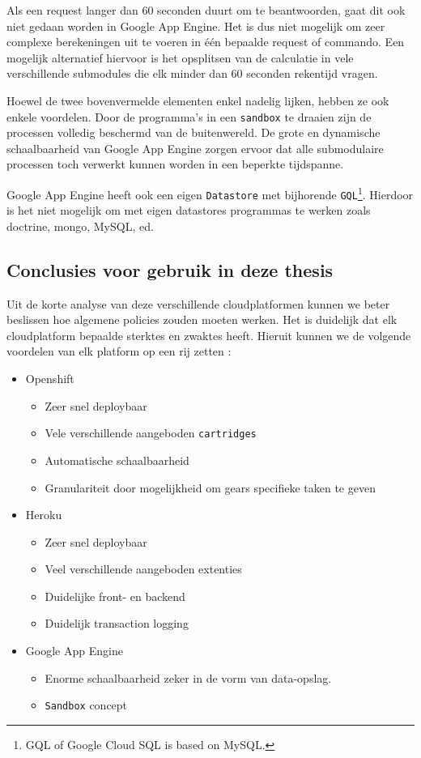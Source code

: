 Als een request langer dan 60 seconden duurt om te beantwoorden, gaat dit ook niet gedaan worden in Google App Engine.
Het is dus niet mogelijk om zeer complexe berekeningen uit te voeren in één bepaalde request of commando.
Een mogelijk alternatief hiervoor is het opsplitsen van de calculatie in vele verschillende submodules die elk minder dan 60 seconden rekentijd vragen.

Hoewel de twee bovenvermelde elementen enkel nadelig lijken, hebben ze ook enkele voordelen.
Door de programma's in een \texttt{sandbox} te draaien zijn de processen volledig beschermd van de buitenwereld.
De grote en dynamische schaalbaarheid van Google App Engine zorgen ervoor dat alle submodulaire processen toch verwerkt kunnen worden in een beperkte tijdspanne.

Google App Engine heeft ook een eigen \texttt{Datastore} met bijhorende \texttt{GQL}\footnote{GQL of Google Cloud SQL is based on MySQL.}.  Hierdoor is het niet mogelijk om met eigen datastores programmas te werken zoals doctrine, mongo, MySQL, ed.

\subsection{Conclusies voor gebruik in deze thesis}
Uit de korte analyse van deze verschillende cloudplatformen kunnen we beter beslissen hoe algemene policies zouden moeten werken.
Het is duidelijk dat elk cloudplatform bepaalde sterktes en zwaktes heeft.
Hieruit kunnen we de volgende voordelen van elk platform op een rij zetten :
\begin{itemize}
	\item Openshift
	\begin{itemize}
		\item Zeer snel deploybaar
		\item Vele verschillende aangeboden \texttt{cartridges}
		\item Automatische schaalbaarheid
		\item Granulariteit door mogelijkheid om gears specifieke taken te geven
	\end{itemize}
	\item Heroku
	\begin{itemize}
		\item Zeer snel deploybaar
		\item Veel verschillende aangeboden extenties
		\item Duidelijke front- en backend
		\item Duidelijk transaction logging
	\end{itemize}
	\item Google App Engine
	\begin{itemize}
		\item Enorme schaalbaarheid zeker in de vorm van data-opslag.
		\item \texttt{Sandbox} concept
	\end{itemize}
\end{itemize}


